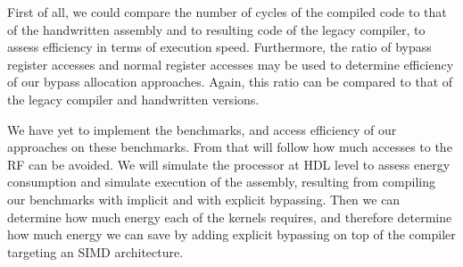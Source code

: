 First of all, we could compare the number of cycles of the compiled code to that of the handwritten assembly and to resulting code of the legacy compiler, to assess efficiency in terms of execution speed. Furthermore, the ratio of bypass register accesses and normal register accesses may be used to determine efficiency of our bypass allocation approaches. Again, this ratio can be compared to that of the legacy compiler and handwritten versions.

We have yet to implement the benchmarks, and access efficiency of our approaches on these benchmarks. From that will follow how much accesses to the RF can be avoided. We will simulate the processor at HDL level to assess energy consumption and simulate execution of the assembly, resulting from compiling our benchmarks with implicit and with explicit bypassing. Then we can determine how much energy each of the kernels requires, and therefore determine how much energy we can save by adding explicit bypassing on top of the compiler targeting an SIMD architecture. 